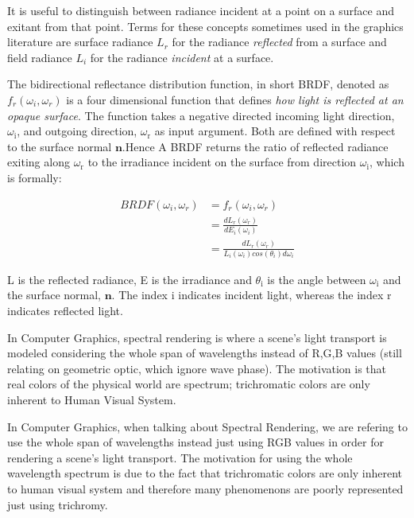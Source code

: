 It is useful to distinguish between radiance incident at a point on a surface and exitant from that point. Terms for these concepts sometimes used in the graphics literature are surface radiance $L_r$ for the radiance \textit{reflected} from a surface and field radiance $L_i$ for the radiance \textit{incident} at a surface.  

\label{brdf}

The bidirectional reflectance distribution function, in short BRDF, denoted as $f_r(\omega_i, \omega_r)$ is a four dimensional function that defines \textit{how light is reflected at an opaque surface}. The function takes a negative directed incoming light direction, $\omega_{\text{i}}$, and outgoing direction, $\omega_{\text{r}}$ as input argument. Both are defined with respect to the surface normal $\mathbf{n}$.Hence A BRDF returns the ratio of reflected radiance exiting along $\omega_{\text{r}}$ to the irradiance incident on the surface from direction $\omega_{\text{i}}$, which is formally:
  
\begin{align}
  BRDF(\omega_i, \omega_r)
  & = f_r(\omega_i, \omega_r) \\
  & = \frac{dL_r(\omega_r)}{dE_i(\omega_i)} \\
  & = \frac{dL_r(\omega_r)}{L_i(\omega_i)cos(\theta_i)d\omega_i}
\end{align}

L is the reflected radiance, E is the irradiance and $\theta_{\text{i}}$ is the angle between $\omega_{\text{i}}$ and the surface normal, $\mathbf n$. The index $\text{i}$ indicates incident light, whereas the index $\text{r}$ indicates reflected light.

In Computer Graphics, spectral rendering is where a scene's light transport is modeled considering the whole span of wavelengths instead of R,G,B values (still relating on geometric optic, which ignore wave phase). The motivation is that real colors of the physical world are spectrum; trichromatic colors are only inherent to Human Visual System.

In Computer Graphics, when talking about Spectral Rendering, we are refering to use the whole span of wavelengths instead just using RGB values in order for rendering a scene's light transport. The motivation for using the whole wavelength spectrum is due to the fact that trichromatic colors are only inherent to human visual system and therefore many phenomenons are poorly represented just using trichromy. 

